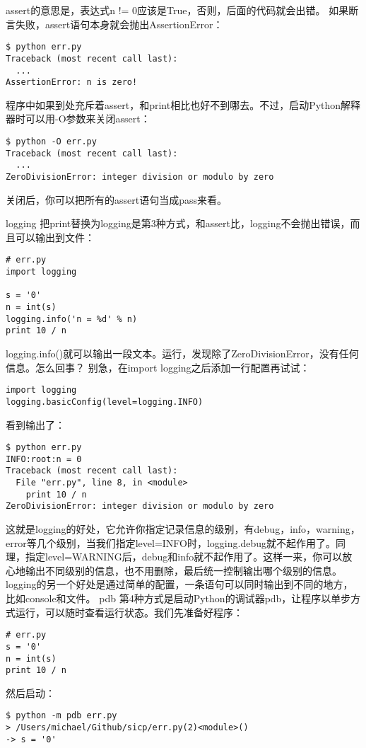 \documentclass[twoside,11pt]{book}
\begin{document}
assert的意思是，表达式n != 0应该是True，否则，后面的代码就会出错。
如果断言失败，assert语句本身就会抛出AssertionError：
\begin{lstlisting}
$ python err.py
Traceback (most recent call last):
  ...
AssertionError: n is zero!
\end{lstlisting}

程序中如果到处充斥着assert，和print相比也好不到哪去。不过，启动Python解释器时可以用-O参数来关闭assert：
\begin{lstlisting}
$ python -O err.py
Traceback (most recent call last):
  ...
ZeroDivisionError: integer division or modulo by zero
\end{lstlisting}

关闭后，你可以把所有的assert语句当成pass来看。

logging
把print替换为logging是第3种方式，和assert比，logging不会抛出错误，而且可以输出到文件：
\begin{lstlisting}
# err.py
import logging

s = '0'
n = int(s)
logging.info('n = %d' % n)
print 10 / n
\end{lstlisting}

logging.info()就可以输出一段文本。运行，发现除了ZeroDivisionError，没有任何信息。怎么回事？
别急，在import logging之后添加一行配置再试试：
\begin{lstlisting}
import logging
logging.basicConfig(level=logging.INFO)
\end{lstlisting}

看到输出了：
\begin{lstlisting}
$ python err.py
INFO:root:n = 0
Traceback (most recent call last):
  File "err.py", line 8, in <module>
    print 10 / n
ZeroDivisionError: integer division or modulo by zero
\end{lstlisting}

这就是logging的好处，它允许你指定记录信息的级别，有debug，info，warning，error等几个级别，当我们指定level=INFO时，logging.debug就不起作用了。同理，指定level=WARNING后，debug和info就不起作用了。这样一来，你可以放心地输出不同级别的信息，也不用删除，最后统一控制输出哪个级别的信息。
logging的另一个好处是通过简单的配置，一条语句可以同时输出到不同的地方，比如console和文件。
pdb
第4种方式是启动Python的调试器pdb，让程序以单步方式运行，可以随时查看运行状态。我们先准备好程序：
\begin{lstlisting}
# err.py
s = '0'
n = int(s)
print 10 / n
\end{lstlisting}

然后启动：
\begin{lstlisting}
$ python -m pdb err.py
> /Users/michael/Github/sicp/err.py(2)<module>()
-> s = '0'
\end{lstlisting}
\end{document}
